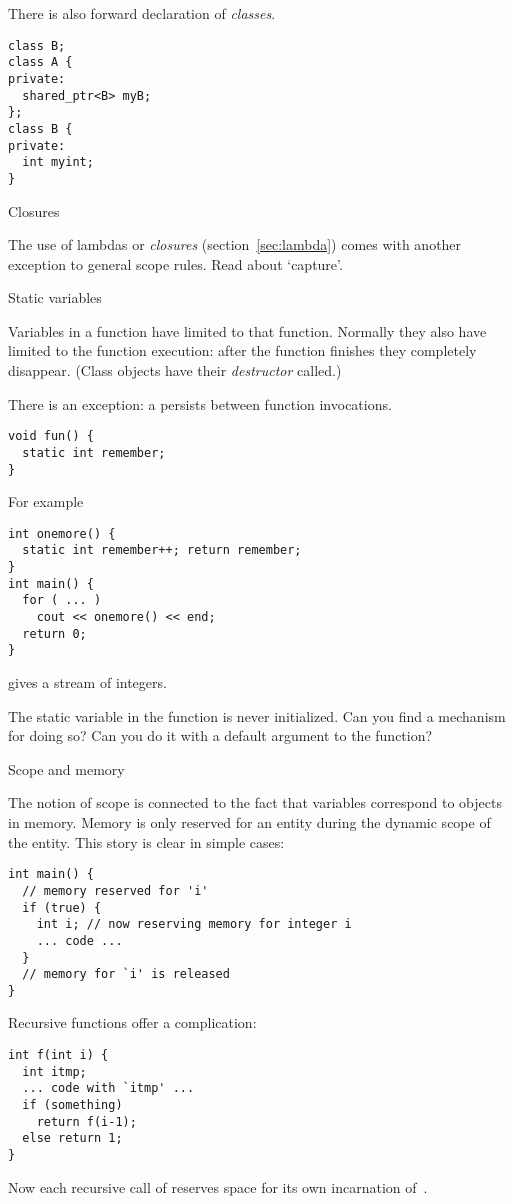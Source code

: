 There is also forward declaration of
%
\emph{classes}.
\begin{verbatim}
class B;
class A {
private:
  shared_ptr<B> myB;
};
class B {
private:
  int myint;
}
\end{verbatim}

 {Closures}

The use of 
%
lambdas
or
%
\emph{closures} (section~\ref{sec:lambda}) comes with
another exception to general scope rules. Read about `capture'.

 {Static variables}
\label{sec:static-scope}

Variables in a function have  limited to
that function. Normally they also have 
limited to the function execution: after the function finishes they
completely disappear. (Class objects have their
%
\emph{destructor}
called.)

There is an exception: a  persists
between function invocations.
\begin{verbatim}
void fun() {
  static int remember;
}
\end{verbatim}
For example
\begin{verbatim}
int onemore() {
  static int remember++; return remember;
}
int main() {
  for ( ... )
    cout << onemore() << end;
  return 0;
}
\end{verbatim}
gives a stream of integers.
\begin{exercise}
  The static variable in the  function is never
  initialized. Can you find a mechanism for doing so?
  Can you do it with a default argument to the function?
\end{exercise}

 {Scope and memory}

The notion of scope is connected to the fact that variables correspond
to objects in memory. Memory is only reserved for an entity during the
dynamic scope of the entity. This story is clear in simple cases:
\begin{verbatim}
int main() {
  // memory reserved for 'i'
  if (true) {
    int i; // now reserving memory for integer i
    ... code ...
  }
  // memory for `i' is released
}
\end{verbatim}
Recursive functions offer a complication:
\begin{verbatim}
int f(int i) {
  int itmp;
  ... code with `itmp' ...
  if (something)
    return f(i-1);
  else return 1;
}
\end{verbatim}
Now each recursive call of  reserves space for its own
incarnation of~.

